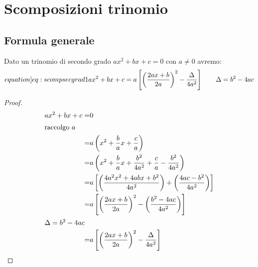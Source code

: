 \chapter{Scomposizioni trinomio}
\section{Formula generale}
\begin{thm}\label{thm:scompsecgrad1}
Dato un trinomio di secondo grado $ax^2+bx+c=0$ con $a\neq 0$ avremo:\begin{equation}\label[equation]{eq:scompsecgrad1}
ax^2+bx+c=a\left[\left(\dfrac{2ax+b}{2a}\right)^2-\dfrac{\Delta}{4a^2}\right]\qquad\Delta=b^2-4ac
\end{equation}
\end{thm}
\begin{proof}
	\begin{align*}
	ax^2+bx+c=&0\\
	\intertext{raccolgo $a$}
	=&a\left(x^2+\frac{b}{a}x+\frac{c}{a}\right)\\
	=&a\left(x^2+\frac{b}{a}x+\frac{b^2}{4a^2}+\frac{c}{a}-\frac{b^2}{4a^2}\right)\\
	=&a\left[\left(\frac{4a^2x^2+4abx+b^2}{4a^2}\right)+\left(\frac{4ac-b^2}{4a^2}\right)\right]\\
	=&a\left[\left(\frac{2ax+b}{2a}\right)^2-\left(\frac{b^2-4ac}{4a^2}\right)\right]\\
	\intertext{$\Delta=b^2-4ac$}
	=&a\left[\left(\frac{2ax+b}{2a}\right)^2-\frac{\Delta}{4a^2}\right]
	\end{align*}
\end{proof}
